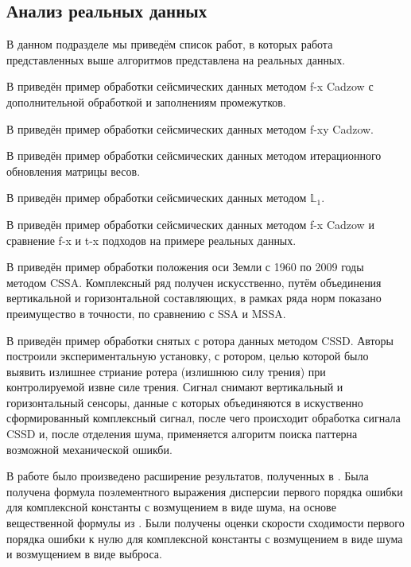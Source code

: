 \documentclass[specialist,
               substylefile = spbu.rtx,
               subf,href,colorlinks=true, 12pt]{disser}
\begin{document}
\subsection{Анализ реальных данных}
В данном подразделе мы приведём список работ, в которых работа представленных выше алгоритмов представлена на реальных данных.

В \cite{RajeshTiwari} приведён пример обработки сейсмических данных методом f-x Cadzow с дополнительной обработкой и заполнениям промежутков.

В \cite{Trickett2008} приведён пример обработки сейсмических данных методом f-xy Cadzow.

В \cite{Chen} приведён пример обработки сейсмических данных методом итерационного обновления матрицы весов.

В \cite{Galbraith.etal15} приведён пример обработки сейсмических данных методом $\mathbb{L}_1$.

В \cite{YuanWang11} приведён пример обработки сейсмических данных методом f-x Cadzow и сравнение f-x и t-x подходов на примере реальных данных.

В \cite{Li18} приведён пример обработки положения оси Земли с 1960 по 2009 годы методом CSSA. Комплексный ряд получен искусственно, путём объединения вертикальной и горизонтальной составляющих, в рамках ряда норм показано преимущество в точности, по сравнению с SSA и MSSA.

В \cite{Pang.etal19} приведён пример обработки снятых с ротора данных методом CSSD. Авторы построили экспериментальную установку, с ротором, целью которой было выявить излишнее стриание ротера (излишнюю силу трения) при контролируемой извне силе  трения. Сигнал снимают вертикальный и горизонтальный сенсоры, данные с которых объединяются в искуственно сформированный комплексный сигнал, после чего происходит обработка сигнала CSSD и, после отделения шума, применяется алгоритм поиска паттерна возможной механической ошикби.



\conclusion
В работе было произведено расширение результатов, полученных в \cite{SenBach}. Была получена формула поэлементного выражения дисперсии первого порядка ошибки для комплексной константы с возмущением в виде шума, на основе вещественной формулы из \cite{Vlas2008}. Были получены оценки скорости сходимости первого порядка ошибки к нулю для комплексной константы с возмущением в виде шума и возмущением в виде выброса.
\end{document}
